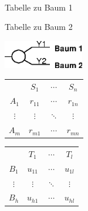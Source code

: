 \vspace{0.5cm}

\begin{small}
\parbox{3.5cm}{\ }
\parbox{4.5cm}{\begin{center}Tabelle zu Baum 1\end{center}}
\parbox{4.5cm}{\begin{center}Tabelle zu Baum 2\end{center}}

\parbox{3.5cm}{\includegraphics[width=3.5cm]{Grafiken/Beispiel1b_4.eps}}
\parbox{4.5cm}{
\begin{tabular}{c|ccc|}
         & $S_1$    & $\cdots$ & $S_n$     \\ \cline{1-4}
$A_1$    & $r_{11}$ & $\cdots$ & $r_{1n}$  \\ %
$\vdots$ & $\vdots$ & $\ddots$ & $\vdots$  \\ %
$A_m$    & $r_{m1}$ & $\cdots$ & $r_{mn}$  \\ \cline{1-4}
\end{tabular}}
\parbox{4.5cm}{
\begin{tabular}{c|ccc|}
         & $T_1$    & $\cdots$ & $T_l$     \\ \cline{1-4}
$B_1$    & $u_{11}$ & $\cdots$ & $u_{1l}$  \\ %
$\vdots$ & $\vdots$ & $\ddots$ & $\vdots$  \\ %
$B_h$    & $u_{h1}$ & $\cdots$ & $u_{hl}$  \\ \cline{1-4}
\end{tabular}}
\end{small}

\vspace{0.5cm}

